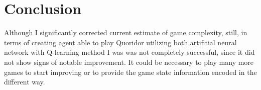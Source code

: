 \chapter{Conclusion}\label{chap:6}

Although I significantly corrected current estimate of game complexity, still,
in terms of creating agent able to play Quoridor utilizing
both artifitial neural network with Q-learning method I was was not completely
successful, since it did not show signs of notable improvement.
It could be necessary to play many more games to start improving or to provide
the game state information encoded in the different way.
